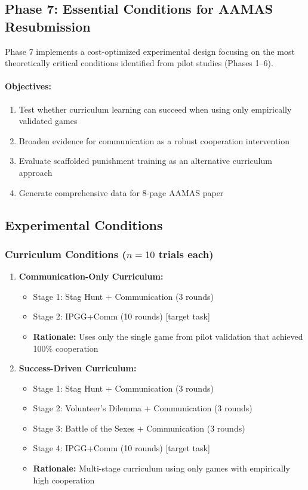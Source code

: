 \subsection{Phase 7: Essential Conditions for AAMAS Resubmission}

Phase 7 implements a cost-optimized experimental design focusing on the most theoretically critical conditions identified from pilot studies (Phases 1--6).

\paragraph{Objectives:}
\begin{enumerate}
    \item Test whether curriculum learning can succeed when using only empirically validated games
    \item Broaden evidence for communication as a robust cooperation intervention
    \item Evaluate scaffolded punishment training as an alternative curriculum approach
    \item Generate comprehensive data for 8-page AAMAS paper
\end{enumerate}

\subsection{Experimental Conditions}

\subsubsection{Curriculum Conditions ($n = 10$ trials each)}

\begin{enumerate}
    \item \textbf{Communication-Only Curriculum:}
    \begin{itemize}
        \item Stage 1: Stag Hunt + Communication (3 rounds)
        \item Stage 2: IPGG+Comm (10 rounds) [target task]
        \item \textbf{Rationale:} Uses only the single game from pilot validation that achieved 100\% cooperation
    \end{itemize}

    \item \textbf{Success-Driven Curriculum:}
    \begin{itemize}
        \item Stage 1: Stag Hunt + Communication (3 rounds)
        \item Stage 2: Volunteer's Dilemma + Communication (3 rounds)
        \item Stage 3: Battle of the Sexes + Communication (3 rounds)
        \item Stage 4: IPGG+Comm (10 rounds) [target task]
        \item \textbf{Rationale:} Multi-stage curriculum using only games with empirically high cooperation
    \end{itemize}
\end{enumerate}

